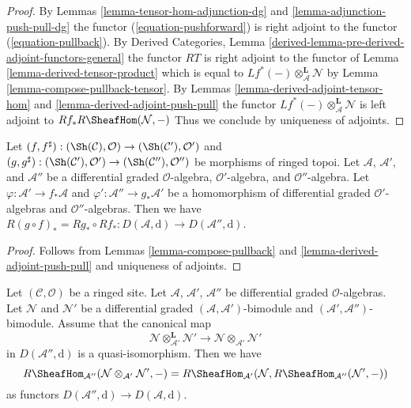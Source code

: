 \begin{proof}
By Lemmas \ref{lemma-tensor-hom-adjunction-dg} and
\ref{lemma-adjunction-push-pull-dg} the functor
(\ref{equation-pushforward}) is right adjoint to
the functor (\ref{equation-pullback}). By Derived Categories, Lemma
\ref{derived-lemma-pre-derived-adjoint-functors-general}
the functor $RT$ is right adjoint to the functor
of Lemma \ref{lemma-derived-tensor-product} which is equal to
$Lf^*(-) \otimes_\mathcal{A}^\mathbf{L} \mathcal{N}$ by
Lemma \ref{lemma-compose-pullback-tensor}.
By Lemmas \ref{lemma-derived-adjoint-tensor-hom} and
\ref{lemma-derived-adjoint-push-pull} the functor
$Lf^*(-) \otimes_\mathcal{A}^\mathbf{L} \mathcal{N}$
is left adjoint to
$Rf_* R\SheafHom(\mathcal{N}, -)$
Thus we conclude by uniqueness of adjoints.
\end{proof}

\begin{lemma}
\label{lemma-compose-pushforward}
Let $(f, f^\sharp) : (\Sh(\mathcal{C}), \mathcal{O})
\to (\Sh(\mathcal{C}'), \mathcal{O}')$ and
$(g, g^\sharp) : (\Sh(\mathcal{C}'), \mathcal{O}')
\to (\Sh(\mathcal{C}''), \mathcal{O}'')$
be morphisms of ringed topoi. Let $\mathcal{A}$, $\mathcal{A}'$, and
$\mathcal{A}''$ be a differential graded $\mathcal{O}$-algebra,
$\mathcal{O}'$-algebra, and $\mathcal{O}''$-algebra. Let
$\varphi : \mathcal{A}' \to f_*\mathcal{A}$ and
$\varphi' : \mathcal{A}'' \to g_*\mathcal{A}'$
be a homomorphism of differential graded $\mathcal{O}'$-algebras
and $\mathcal{O}''$-algebras.
Then we have $R(g \circ f)_* = Rg_* \circ Rf_* :
D(\mathcal{A}, \text{d}) \to D(\mathcal{A}'', \text{d})$.
\end{lemma}

\begin{proof}
Follows from Lemmas \ref{lemma-compose-pullback} and
\ref{lemma-derived-adjoint-push-pull}
and uniqueness of adjoints.
\end{proof}

\begin{lemma}
\label{lemma-compose-hom}
Let $(\mathcal{C}, \mathcal{O})$ be a ringed site. Let
$\mathcal{A}$, $\mathcal{A}'$, $\mathcal{A}''$ be differential graded
$\mathcal{O}$-algebras. Let $\mathcal{N}$ and $\mathcal{N}'$ be a
differential graded $(\mathcal{A}, \mathcal{A}')$-bimodule
and $(\mathcal{A}', \mathcal{A}'')$-bimodule. Assume
that the canonical map
$$
\mathcal{N} \otimes_{\mathcal{A}'}^\mathbf{L} \mathcal{N}'
\longrightarrow
\mathcal{N} \otimes_{\mathcal{A}'} \mathcal{N}'
$$
in $D(\mathcal{A}'', \text{d})$ is a quasi-isomorphism.
Then we have
$$
R\SheafHom_{\mathcal{A}''}
(\mathcal{N} \otimes_{\mathcal{A}'} \mathcal{N}', -)
=
R\SheafHom_{\mathcal{A}'}(\mathcal{N},
R\SheafHom_{\mathcal{A}''}(\mathcal{N}', -))
$$
as functors $D(\mathcal{A}'', \text{d}) \to D(\mathcal{A}, \text{d})$.
\end{lemma}

